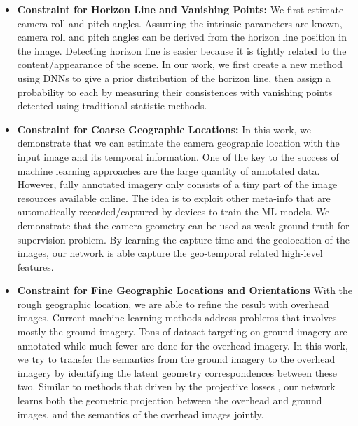 \begin{itemize}[noitemsep]
  \item \textbf{Constraint for Horizon Line and Vanishing Points:}
  We first estimate camera roll and pitch angles. Assuming the intrinsic
  parameters are known, camera roll and pitch angles can be
  derived from the horizon line position in the image. Detecting horizon
  line is easier because it is tightly related to the content/appearance
  of the scene. In our work, we first create a new method using DNNs to
  give a prior distribution of the horizon line, then assign a
  probability to each by measuring their consistences with vanishing
  points detected using traditional statistic methods. \newline

  \item \textbf{Constraint for Coarse Geographic Locations:}
  In this work, we demonstrate that we can estimate the camera geographic
  location with the input image and its temporal information.
  One of the key to the success of machine learning approaches are the
  large quantity of annotated data. However, fully annotated imagery
  only consists of a tiny part of the image resources available online.
  The idea is to exploit other meta-info that are automatically
  recorded/captured by devices to train the ML models. We demonstrate
  that the camera geometry can be used as weak ground truth for
  supervision problem. By learning the capture time and the geolocation
  of the images, our network is able capture the geo-temporal related
  high-level features. \newline

  \item \textbf{Constraint for Fine Geographic Locations and Orientations}
  With the rough geographic location, we are able to refine the result
  with overhead images.
  Current machine learning methods address problems that involves mostly
  the ground imagery. Tons of dataset targeting on ground imagery are
  annotated while much fewer are done for the overhead imagery.
  In this work, we try to transfer the semantics from the ground imagery
  to the overhead imagery by identifying the latent geometry
  correspondences between these two. Similar to methods that driven by
  the projective losses , our network learns 
  both the geometric projection between the overhead and ground
  images, and the semantics of the overhead images jointly. \newline

\end{itemize}
